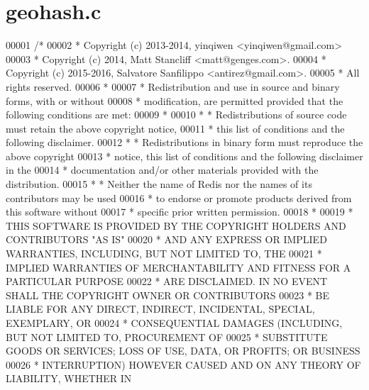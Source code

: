 \hypertarget{geohash_8c_source}{}\section{geohash.\+c}
\label{geohash_8c_source}

\begin{DoxyCode}
00001 \textcolor{comment}{/*}
00002 \textcolor{comment}{ * Copyright (c) 2013-2014, yinqiwen <yinqiwen@gmail.com>}
00003 \textcolor{comment}{ * Copyright (c) 2014, Matt Stancliff <matt@genges.com>.}
00004 \textcolor{comment}{ * Copyright (c) 2015-2016, Salvatore Sanfilippo <antirez@gmail.com>.}
00005 \textcolor{comment}{ * All rights reserved.}
00006 \textcolor{comment}{ *}
00007 \textcolor{comment}{ * Redistribution and use in source and binary forms, with or without}
00008 \textcolor{comment}{ * modification, are permitted provided that the following conditions are met:}
00009 \textcolor{comment}{ *}
00010 \textcolor{comment}{ *  * Redistributions of source code must retain the above copyright notice,}
00011 \textcolor{comment}{ *    this list of conditions and the following disclaimer.}
00012 \textcolor{comment}{ *  * Redistributions in binary form must reproduce the above copyright}
00013 \textcolor{comment}{ *    notice, this list of conditions and the following disclaimer in the}
00014 \textcolor{comment}{ *    documentation and/or other materials provided with the distribution.}
00015 \textcolor{comment}{ *  * Neither the name of Redis nor the names of its contributors may be used}
00016 \textcolor{comment}{ *    to endorse or promote products derived from this software without}
00017 \textcolor{comment}{ *    specific prior written permission.}
00018 \textcolor{comment}{ *}
00019 \textcolor{comment}{ * THIS SOFTWARE IS PROVIDED BY THE COPYRIGHT HOLDERS AND CONTRIBUTORS "AS IS"}
00020 \textcolor{comment}{ * AND ANY EXPRESS OR IMPLIED WARRANTIES, INCLUDING, BUT NOT LIMITED TO, THE}
00021 \textcolor{comment}{ * IMPLIED WARRANTIES OF MERCHANTABILITY AND FITNESS FOR A PARTICULAR PURPOSE}
00022 \textcolor{comment}{ * ARE DISCLAIMED. IN NO EVENT SHALL THE COPYRIGHT OWNER OR CONTRIBUTORS}
00023 \textcolor{comment}{ * BE LIABLE FOR ANY DIRECT, INDIRECT, INCIDENTAL, SPECIAL, EXEMPLARY, OR}
00024 \textcolor{comment}{ * CONSEQUENTIAL DAMAGES (INCLUDING, BUT NOT LIMITED TO, PROCUREMENT OF}
00025 \textcolor{comment}{ * SUBSTITUTE GOODS OR SERVICES; LOSS OF USE, DATA, OR PROFITS; OR BUSINESS}
00026 \textcolor{comment}{ * INTERRUPTION) HOWEVER CAUSED AND ON ANY THEORY OF LIABILITY, WHETHER IN}

\end{DoxyCode}
